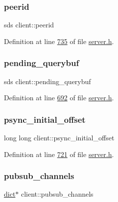 \subsubsection{\texorpdfstring{peerid}{peerid}}
{\footnotesize\ttfamily sds client\+::peerid}



Definition at line \hyperlink{server_8h_source_l00735}{735} of file \hyperlink{server_8h_source}{server.\+h}.

\mbox{\label{structclient_a178e18bd0b09afee0d244c1b1e1a46ba}} 
\subsubsection{\texorpdfstring{pending\+\_\+querybuf}{pending\_querybuf}}
{\footnotesize\ttfamily sds client\+::pending\+\_\+querybuf}



Definition at line \hyperlink{server_8h_source_l00692}{692} of file \hyperlink{server_8h_source}{server.\+h}.

\mbox{\label{structclient_ad5a601854272442ac3be11f2080536af}} 
\subsubsection{\texorpdfstring{psync\+\_\+initial\+\_\+offset}{psync\_initial\_offset}}
{\footnotesize\ttfamily long long client\+::psync\+\_\+initial\+\_\+offset}



Definition at line \hyperlink{server_8h_source_l00721}{721} of file \hyperlink{server_8h_source}{server.\+h}.

\mbox{\label{structclient_a387de498270f2a643eaf671fd058203b}} 
\subsubsection{\texorpdfstring{pubsub\+\_\+channels}{pubsub\_channels}}
{\footnotesize\ttfamily \hyperlink{structdict}{dict}$\ast$ client\+::pubsub\+\_\+channels}



